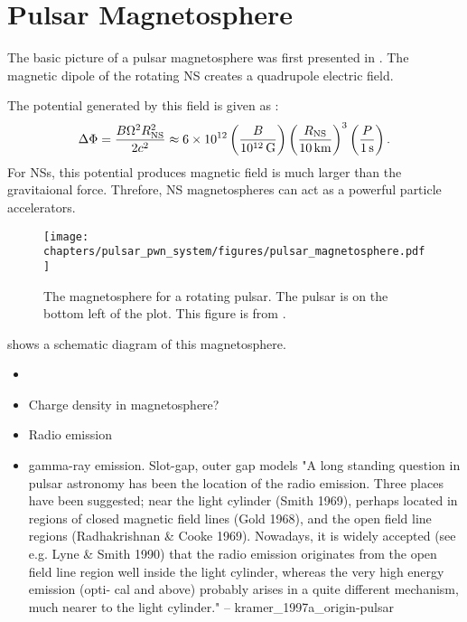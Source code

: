 \section{Pulsar Magnetosphere}

The basic picture of a pulsar magnetosphere was first presented in
\cite{goldreich_1969_pulsar-electrodynamics}.  The magnetic dipole
of the rotating \ac{NS} creates a quadrupole electric field.

The potential generated
by this field is given as \citep{goldreich_1969_pulsar-electrodynamics}:
\begin{equation}
\Delta \Phi = \frac{B \Omega^2 R_\text{NS}^2}{2c^2}
\approx 6\times 10^{12} 
\left(\frac{B}{10^{12}\,\text{G}}\right)
\left(\frac{R_\text{NS}}{10\,\text{km}}\right)^3
\left(\frac{P}{1\,\text{s}}\right).
\end{equation}
For \acp{NS}, this potential produces magnetic field is much larger than
the gravitaional force. Threfore, \ac{NS} magnetospheres can act as a
powerful particle accelerators.



\begin{figure}[htpb]
  \centering
    \texttt{[image: chapters/pulsar\_pwn\_system/figures/pulsar\_magnetosphere.pdf]}
  \caption{The magnetosphere for a rotating pulsar.
  The pulsar is on the bottom left of the plot. This figure is
  from \cite{goldreich_1969_pulsar-electrodynamics}.}
\end{figure}

 shows a schematic diagram of this
magnetosphere.

\begin{itemize}
  \item
\item Charge density in magnetosphere?
  \item Radio emission
  \item gamma-ray emission. Slot-gap, outer gap models
"A long standing question in pulsar astronomy has been the location
of the radio emission. Three places have been suggested; near the light
cylinder (Smith 1969), perhaps located in regions of closed magnetic
field lines (Gold 1968), and the open field line regions (Radhakrishnan
\& Cooke 1969). Nowadays, it is widely accepted (see e.g. Lyne \& Smith
1990) that the radio emission originates from the open field line region
well inside the light cylinder, whereas the very high energy emission
(opti- cal and above) probably arises in a quite different mechanism,
much nearer to the light cylinder." -- kramer\_1997a\_origin-pulsar
\end{itemize}


